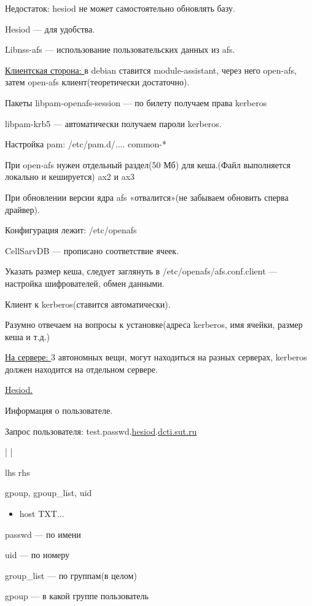 \par 
Недостаток: hesiod не может самостоятельно
обновлять базу.
\par 
Hesiod — для удобства.
\par 
Libnss-afs — использование пользовательских
данных из afs.
\par \underline{Клиентская
сторона: }в
debian ставится module-assistant, через него
open-afs, затем open-afs клиент(теоретически
достаточно).
\par 
Пакеты libpam-openafs-session — по билету получаем
права kerberos
\par 
	  libpam-krb5 — автоматически получаем пароли
kerberos.
\par 
Настройка pam: /etc/pam.d/.... common-*
\par 
При open-afs нужен отдельный раздел(50 Мб)
для кеша.(Файл выполняется локально и
кешируется) ax2 и ax3
\par 
При обновлении версии ядра afs «отвалится»(не
забываем обновить сперва драйвер).
\par 
Конфигурация лежит: /etc/openafs
\par 
CellSarvDB — прописано соответствие ячеек.
\par 
Указать размер кеша, следует заглянуть
в /etc/openafs/afs.conf.client — настройка шифрователей,
обмен данными.
\par 
Клиент к kerberos(ставится автоматически).
\par 
Разумно отвечаем на вопросы к
установке(адреса kerberos, имя ячейки, размер
кеша и т.д.)
\par \underline{На
сервере: }
3 автономных вещи, могут находиться на
разных серверах, kerberos должен находится
на отдельном сервере.
\par 
\underline{Hesiod.}
\par 
Информация о пользователе.
\par Запрос
пользователя: test.passwd.\underline{hesiod}.\underline{dcti.sut.ru}
\par 
                                                            |
             |
\par 
                                                           lhs	
  rhs
\par 
gpoup, gpoup\_list, uid
\begin{itemize}
	\item \par 
	host TXT...
\end{itemize}
\par 
passwd — по имени
\par 
uid — по номеру
\par 
group\_list — по группам(в целом)
\par 
gpoup — в какой группе пользователь 

